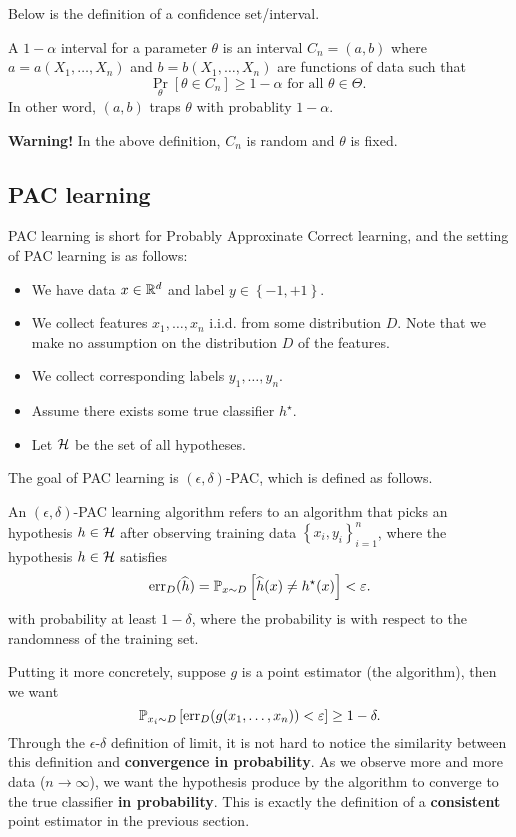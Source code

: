 \documentclass[a4paper]{article}
\begin{document}
Below is the definition of a confidence set/interval.

\begin{defi}
  A $1 - \alpha$ interval for a parameter $\theta$ is
  an interval $C_n = (a, b)$ where
  $a = a(X_1, \dots, X_n)$ and $b = b(X_1, \dots, X_n)$
  are functions of data such that
  \[
  \Pr_\theta[\theta \in C_n] \geq 1 - \alpha
  \text{ for all $\theta \in \Theta$. }
  \]
  In other word, $(a, b)$ traps $\theta$ with probablity
  $1 - \alpha$.
\end{defi}

\textbf{Warning!} In the above definition,
$C_n$ is random and $\theta$ is fixed.

\subsection{PAC learning}

PAC learning is short for Probably Approxinate Correct
learning, and the setting of PAC learning is as follows:
\begin{itemize}
  \item We have data $x \in \mathbb{R}^d$ and label $y \in \left\{ -1,
  +1 \right\}$.
  \item We collect features $x_1, \dots, x_n$ i.i.d. from
  some distribution $D$. Note that we make no assumption on
  the distribution $D$ of the features.
  \item We collect corresponding labels $y_1, \dots, y_n$.
  \item Assume there exists some true classifier $h^\star$.
  \item Let $\mathcal{H}$ be the set of all hypotheses.
\end{itemize}
The goal of PAC learning is $(\epsilon, \delta)$-PAC,
which is defined as follows.
\begin{defi}
  An $(\epsilon, \delta)$-PAC learning algorithm
  refers to an algorithm that
  picks an hypothesis $h \in \mathcal{H}$
  after observing training data
  $\left\{ x_i, y_i \right\}_{i=1}^n$,
  where the hypothesis $h \in \mathcal{H}$ satisfies
  \[
  \operatorname{err}_D (\widehat{h}) =
  \mathbb{P}_{x \sim D} \left[ \widehat{h}(x) \neq h^\star(x) \right]
  < \varepsilon.
  \]
  with probability at least $1 - \delta$, where the probability
  is with respect to the randomness of the training set.
\end{defi}
Putting it more concretely, suppose $g$ is a point estimator
(the algorithm), then we want
\[
\mathbb{P}_{x_i \sim D} \left[ \operatorname{err}_D (g(x_1, \dots, x_n)) < \varepsilon
\right] \geq 1 - \delta.
\]
Through the $\epsilon$-$\delta$ definition of limit,
it is not hard to
notice the similarity between this definition
and \textbf{convergence in probability}.
As we observe more and more data ($n \to \infty$),
we want the hypothesis
produce by the algorithm to converge to the true classifier
\textbf{in probability}. This is exactly the definition
of a \textbf{consistent} point estimator in the previous
section.
\end{document}
